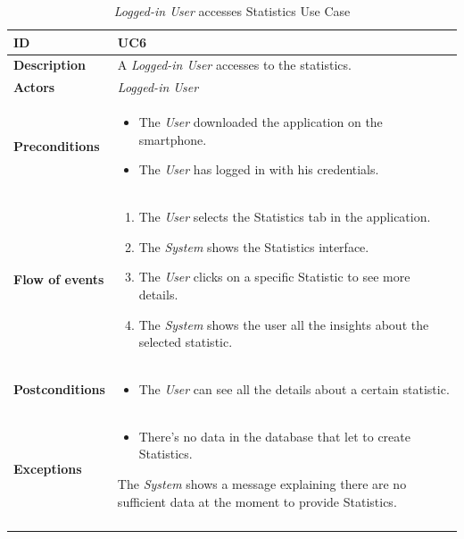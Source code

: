 \documentclass {article}
\begin{document}
	\begin{longtable}{| p{3 cm} | p{10.5 cm} |} 
			\hline
			{\bf ID} & UC6 \\
			\hline
			{\bf Description} & A {\it Logged-in User} accesses to the statistics.\\
			\hline
			{\bf Actors} & {\it Logged-in User}\\
			\hline
			{\bf Preconditions} & 	
			\begin{itemize}
				\item The {\it User} downloaded the application on the smartphone.
				\item The {\it User} has logged in with his credentials.
			\end{itemize}
			\\
			\hline
			{\bf Flow of events} &	
			\begin{enumerate}
				\item The {\it User} selects the Statistics tab in the application.
				\item The {\it System} shows the Statistics interface.
				\item The {\it User} clicks on a specific Statistic to see more details. 
				\item The {\it System} shows the user all the insights about the selected statistic. 
			\end{enumerate}
			\\
			\hline
			{\bf Postconditions} & 
			\begin{itemize}
				\item The {\it User} can see all the details about a certain statistic.
			\end{itemize}
			\\
			\hline
			{\bf Exceptions} & 
			\begin{itemize}
				\item There's no data in the database that let to create Statistics.
			\end{itemize}
			The {\it System} shows a message explaining there are no sufficient data at the moment to provide Statistics.
			\\ 
			\hline
			\caption{{\it Logged-in User} accesses Statistics Use Case}
			\end{longtable}
			\pagebreak
\end{document}
